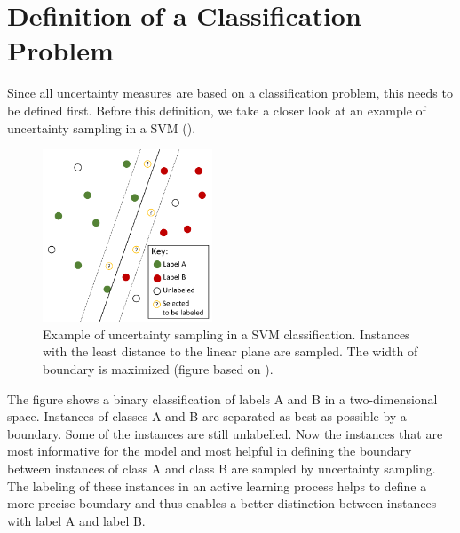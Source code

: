 \section{Definition of a Classification Problem}
\label{sec:definition_of_a_classification_problem}
%
Since all uncertainty measures are based on a classification problem, this needs to be defined first.
Before this definition, we take a closer look at an example of uncertainty sampling in a \ac{SVM} ().
\begin{figure}[H]
  \centering
    \includegraphics[width=0.45\textwidth]{figures/SVM.pdf}
  \caption{Example of uncertainty sampling in a \ac{SVM} classification. Instances with the least distance to the linear plane are sampled.
  The width of boundary is maximized  (figure based on \cite{human-in-the-loop}).}
  \label{fig:svm}
\end{figure}
The figure shows a binary classification of labels A and B in a two-dimensional space.
Instances of classes A and B are separated as best as possible by a boundary.
Some of the instances are still unlabelled.
Now the instances that are most informative for the model and most helpful in defining the boundary between instances of class A and class B are sampled by uncertainty sampling.
The labeling of these instances in an active learning process helps to define a more precise boundary and thus enables a better distinction between instances with label A and label B.

